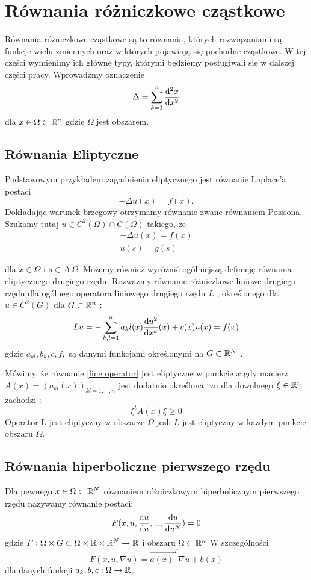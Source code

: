 \documentclass[12pt,a4paper]{report}
\begin{document}
\section{Równania różniczkowe cząstkowe}
Równania różniczkowe cząstkowe są to równania, których rozwiązaniami są funkcje wielu zmiennych oraz w których pojawiają się pochodne cząstkowe. W tej części wymienimy ich główne typy, którymi będziemy  posługiwali się  w dalszej części pracy. Wprowadźmy oznaczenie 
$$
\Delta = \sum_{k=1}^{n} \ddx[{^2 x}]{x^2}  
$$
dla $ x \in \Omega \subset \setR^{n} $ gdzie $\Omega$ jest obszarem. 
\subsection{Równania Eliptyczne}
Podstawowym przykładem zagadnienia eliptycznego jest równanie Laplace'a postaci 
$$
-\Delta u(x) = f(x). 
$$
Dokładając warunek brzegowy otrzymamy równanie zwane równaniem Poissona. Szukamy tutaj $u \in C^2(\Omega) \cap C(\Omega)$ takiego, że %
\begin{align*}
-\Delta u(x) = f(x)  \\
u(s) = g(s) 
\end{align*}

dla $x \in \Omega$ i $s \in \eth \Omega$. 
Możemy również wyróżnić ogólniejszą definicję równania eliptycznego drugiego rzędu. Rozważmy równanie różniczkowe liniowe drugiego rzędu dla ogólnego operatora liniowego drugiego rzędu $L$ \label{line operator}, określonego dla $ u \in C^2(G)$ dla $G \subset \setR^{n}$ : %
$$
Lu = -\sum_{k,l =1}^{n} a_kl(x) \ddx[u^2]{x^k} (x) + c(x)u(x) = f(x) 
$$
gdzie $ a_{kl}, b_{k}, c, f, $ są danymi funkcjami określonymi na $G \subset \setR^N$ .
\begin{definition}
Mówimy, że równanie  \ref{line operator} jest eliptyczne w punkcie $x$ gdy macierz $A(x) = (a_{kl}(x))_{kl=1,\cdots,n}$ jest dodatnio określona tzn dla dowolnego $ \xi \in \setR^{n}$ zachodzi :
$$
\xi^{t} A(x) \xi \geq 0
$$
Operator L jest eliptyczny w obszarze $\Omega$ jesli $L$ jest eliptyczny w każdym punkcie obszaru $\Omega$.
\end{definition}
\subsection{Równania hiperboliczne pierwszego rzędu}
Dla pewnego $ x \in \Omega \subset \setR^{N} $ równaniem różniczkowym hiperbolicznym pierwszego rzędu nazywamy równanie postaci:
$$
F(x,u,\ddx[{ u}]{u},...,\ddx[{u}]{u^N}) = 0
$$
gdzie $F : \Omega \times G \subset \Omega \times \setR \times \setR^{N} \to \setR$ i obszaru $\Omega \subset \setR^n $
\newline
W szczególności 
$$
F(x,u,\nabla u) = \vec{a(x)}^T \nabla u + b(x)
$$
dla danych funkcji $ a_k,b,c: \Omega \to \setR$. 
\end{document}
